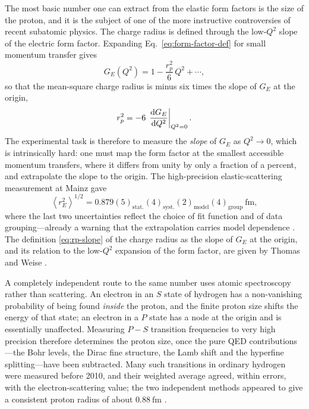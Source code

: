 The most basic number one can extract from the elastic form factors is the size of the
proton, and it is the subject of one of the more instructive controversies of recent
subatomic physics. The charge radius is defined through the low-$Q^{2}$ slope of the
electric form factor. Expanding Eq.~\eqref{eq:form-factor-def} for small momentum
transfer gives
\begin{equation}
    G_{E}(Q^{2}) = 1 - \frac{r_{p}^{2}}{6}\,Q^{2} + \cdots,
    \label{eq:GE-expansion}
\end{equation}
so that the mean-square charge radius is minus six times the slope of $G_{E}$ at the
origin,
\begin{equation}
    r_{p}^{2} = -6\,\left.\dv{G_{E}}{Q^{2}}\right|_{Q^{2}=0}.
    \label{eq:rp-slope}
\end{equation}
The experimental task is therefore to measure the \emph{slope} of $G_{E}$ as $Q^{2}\to 0$,
which is intrinsically hard: one must map the form factor at the smallest accessible
momentum transfers, where it differs from unity by only a fraction of a percent, and
extrapolate the slope to the origin. The high-precision elastic-scattering measurement
at Mainz gave
\begin{equation}
    \left\langle r_{E}^{2}\right\rangle^{1/2}
    = 0.879(5)_{\mathrm{stat.}}(4)_{\mathrm{syst.}}(2)_{\mathrm{model}}(4)_{\mathrm{group}}
      ~\mathrm{fm},
    \label{eq:rp-mainz}
\end{equation}
where the last two uncertainties reflect the choice of fit function and of data
grouping---already a warning that the extrapolation carries model dependence
\cite[Ch.~14]{Amsler2018}. The definition \eqref{eq:rp-slope} of the charge radius as
the slope of $G_{E}$ at the origin, and its relation to the low-$Q^{2}$ expansion of the
form factor, are given by Thomas and Weise \cite[Ch.~2.2]{ThomasWeise2001}.

A completely independent route to the same number uses atomic spectroscopy rather than
scattering. An electron in an $S$ state of hydrogen has a non-vanishing probability of
being found \emph{inside} the proton, and the finite proton size shifts the energy of
that state; an electron in a $P$ state has a node at the origin and is essentially
unaffected. Measuring $P\!-\!S$ transition frequencies to very high precision therefore
determines the proton size, once the pure QED contributions---the Bohr levels, the Dirac
fine structure, the Lamb shift and the hyperfine splitting---have been subtracted. Many
such transitions in ordinary hydrogen were measured before 2010, and their weighted
average agreed, within errors, with the electron-scattering value; the two independent
methods appeared to give a consistent proton radius of about $0.88~\mathrm{fm}$
\cite[Ch.~14]{Amsler2018}.

